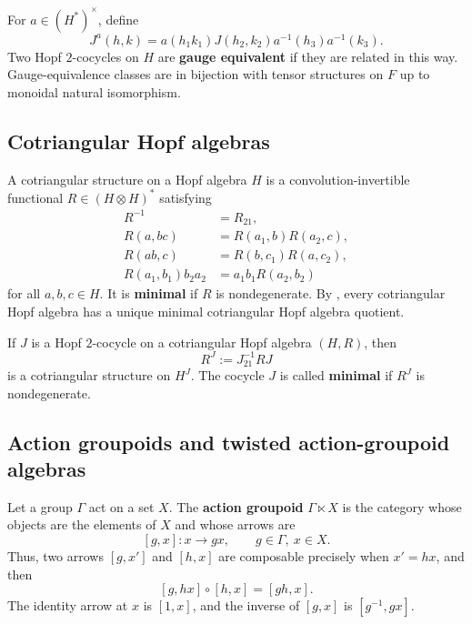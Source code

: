 \documentclass{amsart}
\theoremstyle{definition}
\numberwithin{equation}{section}
\begin{document}
For $a\in(H^*)^\times$, define
\[
 J^a(h,k)
 =a(h_1k_1)J(h_2,k_2)a^{-1}(h_3)a^{-1}(k_3).
\]
Two Hopf $2$-cocycles on $H$ are {\bf gauge equivalent} if they are related in this way.
Gauge-equivalence classes are in bijection with tensor structures on $F$ up to
monoidal natural isomorphism.

\subsection{Cotriangular Hopf algebras}\label{sec:cotriangular}

A cotriangular structure on a Hopf algebra $H$ is a convolution-invertible
functional $R\in(H\otimes H)^*$ satisfying
\begin{align*}
 R^{-1}&=R_{21},\\
 R(a,bc)&=R(a_1,b)R(a_2,c),\\
 R(ab,c)&=R(b,c_1)R(a,c_2),\\
 R(a_1,b_1)b_2a_2&=a_1b_1R(a_2,b_2)
\end{align*}
for all $a,b,c\in H$. It is {\bf minimal} if $R$ is nondegenerate.  By \cite[Proposition 2.1]{G1}, every
cotriangular Hopf algebra has a unique minimal cotriangular Hopf algebra quotient.

If $J$ is a Hopf $2$-cocycle on a cotriangular Hopf algebra $(H,R)$, then
\[
 R^J:=J_{21}^{-1}RJ
\]
is a cotriangular structure on $H^J$.  The cocycle $J$ is called {\bf minimal} if
$R^J$ is nondegenerate.

\subsection{Action groupoids and twisted action-groupoid algebras}
\label{sec:twisted-action-groupoid}
Let a group $\Gamma$ act on a set $X$.  The {\bf action groupoid}
$\Gamma\ltimes X$ is the category whose objects are the elements of $X$ and whose
arrows are
\[
 [g,x]:x\longrightarrow gx,
 \qquad g\in\Gamma,\ x\in X.
\]
Thus, two arrows $[g,x']$ and $[h,x]$ are composable precisely when $x'=hx$, and
then
\[
 [g,hx]\circ[h,x]=[gh,x].
\]
The identity arrow at $x$ is $[1,x]$, and the inverse of $[g,x]$ is
$[g^{-1},gx]$.
\end{document}
